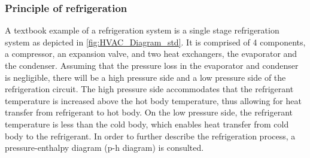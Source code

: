 \subsubsection{Principle of refrigeration}
A textbook example of a refrigeration system is a single stage refrigeration system as depicted in \cref{fig:HVAC_Diagram_std}. It is comprised of 4 components, a compressor, an expansion valve, and two heat exchangers, the evaporator and the condenser. Assuming that the pressure loss in the evaporator and condenser is negligible, there will be a high pressure side and a low pressure side of the refrigeration circuit. The high pressure side accommodates that the refrigerant temperature is increased above the hot body temperature, thus allowing for heat transfer from refrigerant to hot body. On the low pressure side, the refrigerant temperature is less than the cold body, which enables heat transfer from cold body to the refrigerant. In order to further describe the refrigeration process, a pressure-enthalpy diagram (p-h diagram) is consulted.

